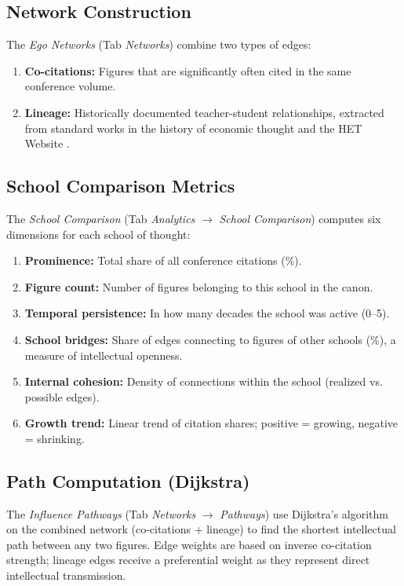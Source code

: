 \documentclass[11pt,a4paper,twoside]{article}
\begin{document}
\subsection{Network Construction}
The \textit{Ego Networks} (Tab \textit{Networks}) combine two types of edges:
\begin{enumerate}[leftmargin=*,itemsep=2pt,topsep=2pt]
    \item \textbf{Co-citations:} Figures that are significantly often cited in the same conference volume.
    \item \textbf{Lineage:} Historically documented teacher-student relationships, extracted from standard works in the history of economic thought and the HET Website \cite{hetwebsite}.
\end{enumerate}

\subsection{School Comparison Metrics}
The \textit{School Comparison} (Tab \textit{Analytics} $\rightarrow$ \textit{School Comparison}) computes six dimensions for each school of thought:
\begin{enumerate}[leftmargin=*,itemsep=2pt,topsep=2pt]
    \item \textbf{Prominence:} Total share of all conference citations (\%).
    \item \textbf{Figure count:} Number of figures belonging to this school in the canon.
    \item \textbf{Temporal persistence:} In how many decades the school was active (0--5).
    \item \textbf{School bridges:} Share of edges connecting to figures of other schools (\%), a measure of intellectual openness.
    \item \textbf{Internal cohesion:} Density of connections within the school (realized vs. possible edges).
    \item \textbf{Growth trend:} Linear trend of citation shares; positive = growing, negative = shrinking.
\end{enumerate}

\subsection{Path Computation (Dijkstra)}
The \textit{Influence Pathways} (Tab \textit{Networks} $\rightarrow$ \textit{Pathways}) use Dijkstra's algorithm on the combined network (co-citations + lineage) to find the shortest intellectual path between any two figures. Edge weights are based on inverse co-citation strength; lineage edges receive a preferential weight as they represent direct intellectual transmission.
\end{document}

